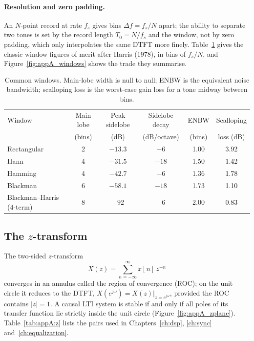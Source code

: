 \paragraph{Resolution and zero padding.} An $N$-point record at rate $f_s$ gives bins
$\Delta f=f_s/N$ apart; the ability to separate two tones is set by the record length
$T_0=N/f_s$ and the window, not by zero padding, which only interpolates the same DTFT more
finely. Table~\ref{tab:appA:windows} gives the classic window figures of merit after
Harris (1978), in bins of $f_s/N$, and Figure~\ref{fig:appA_windows} shows the trade they
summarise.

\begin{table}[htbp]\centering\small
\caption{Common windows. Main-lobe width is null to null; ENBW is the equivalent noise
bandwidth; scalloping loss is the worst-case gain loss for a tone midway between bins.}\label{tab:appA:windows}
\begin{tabular}{@{}lccccc@{}}
\toprule
Window & Main lobe & Peak sidelobe & Sidelobe decay & ENBW & Scalloping\\
 & (bins) & (dB) & (dB/octave) & (bins) & loss (dB)\\
\midrule
Rectangular & 2 & $-13.3$ & $-6$ & 1.00 & 3.92\\
Hann & 4 & $-31.5$ & $-18$ & 1.50 & 1.42\\
Hamming & 4 & $-42.7$ & $-6$ & 1.36 & 1.78\\
Blackman & 6 & $-58.1$ & $-18$ & 1.73 & 1.10\\
Blackman--Harris (4-term) & 8 & $-92$ & $-6$ & 2.00 & 0.83\\
\bottomrule
\end{tabular}
\end{table}


\subsection{The $z$-transform}

The two-sided $z$-transform
\begin{equation}
X(z)=\sum_{n=-\infty}^{\infty}x[n]\,z^{-n}
\label{eq:appA:z}
\end{equation}
converges in an annulus called the region of convergence (ROC); on the unit circle it reduces
to the DTFT, $X(e^{j\omega})=X(z)|_{z=e^{j\omega}}$, provided the ROC contains $|z|=1$. A causal
LTI system is stable if and only if all poles of its transfer function lie strictly inside the
unit circle (Figure~\ref{fig:appA_zplane}). Table~\ref{tab:appA:z} lists the pairs used in
Chapters~\ref{ch:dsp}, \ref{ch:sync} and~\ref{ch:equalization}.

